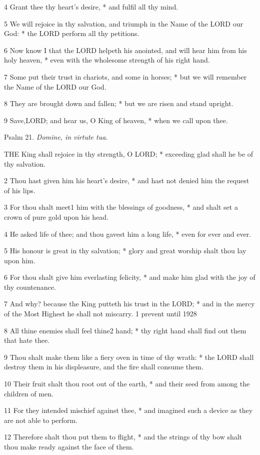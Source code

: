 4 Grant thee thy heart’s desire, * and fulfil
all thy mind.

5 We will rejoice in thy salvation, and triumph in
the Name of the LORD our God: * the LORD
perform all thy petitions.

6 Now know I that the LORD helpeth
his anointed, and will hear him from his holy heaven, * even with the
wholesome strength of his right hand.

7 Some put their trust in chariots, and some in horses;
* but we will remember the Name of the LORD our
God.

8 They are brought down and fallen; * but we are risen
and stand upright.

9 Save,LORD; and hear us, O
King of heaven, * when we call upon thee.

Psalm
21. \emph{Domine, in virtute tua.}

THE
King shall rejoice in thy strength, O LORD; * exceeding
glad shall he be of thy salvation.

2 Thou hast given him his heart’s desire, * and
hast not denied him the request of his lips.

3 For thou shalt meet1 him with the blessings
of goodness, * and shalt set a crown of pure gold upon his head.

4 He asked life of thee; and thou gavest him a long life,
* even for ever and ever.

5 His honour is great in thy salvation; * glory and great
worship shalt thou lay upon him.

6 For thou shalt give him everlasting felicity, * and
make him glad with the joy of thy countenance.

7 And why? because the King putteth his trust in the
LORD; * and in the mercy of the Most Highest he shall
not miscarry. 1 prevent
until 1928

8 All thine enemies shall feel thine2 hand;
* thy right hand shall find out them that hate thee.

9 Thou shalt make them like a fiery oven in time of
thy wrath: * the LORD shall destroy them in his
displeasure, and the fire shall consume them.

10 Their fruit shalt thou root out of the earth, *
and their seed from among the children of men.

11 For they intended mischief against thee, * and imagined
such a device as they are not able to perform.

12 Therefore shalt thou put them to flight, * and the
strings of thy bow shalt thou make ready against the face of them.

